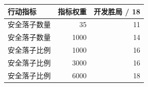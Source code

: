 \begin{tabular}{lrr}
\toprule
行动指标 & 指标权重 & 开发胜局 / 18 \\
\midrule
安全落子数量 & 35 & 11 \\
安全落子数量 & 1000 & 14 \\
安全落子比例 & 1000 & 16 \\
安全落子比例 & 3000 & 16 \\
安全落子比例 & 6000 & 18 \\
\bottomrule
\end{tabular}
